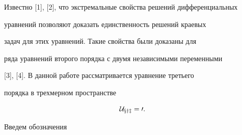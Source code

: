  




\maketitle 


\label{begin} 


 


 


Известно [1], [2], что экстремальные свойства решений дифференциальных 


уравнений позволяют доказать единственность решений краевых 


задач для этих уравнений. Такие свойства были доказаны для 


ряда уравнений второго порядка с двумя независимыми переменными 


[3], [4]. В данной работе рассматривается уравнение третьего 


порядка в трехмерном пространстве 


\begin{equation} 


\cal U_{xyz}=0. 


\end{equation} 


 


Введем обозначения 


